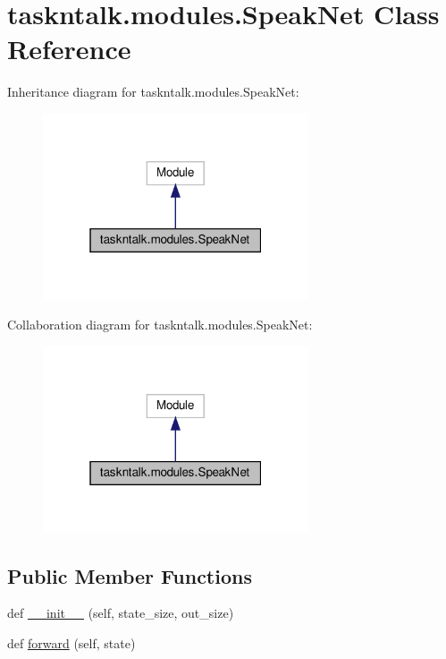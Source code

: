 \hypertarget{classtaskntalk_1_1modules_1_1SpeakNet}{}\section{taskntalk.\+modules.\+Speak\+Net Class Reference}
\label{classtaskntalk_1_1modules_1_1SpeakNet}


Inheritance diagram for taskntalk.\+modules.\+Speak\+Net\+:
\nopagebreak
\begin{figure}[H]
\begin{center}
\leavevmode
\includegraphics[width=223pt]{classtaskntalk_1_1modules_1_1SpeakNet__inherit__graph}
\end{center}
\end{figure}


Collaboration diagram for taskntalk.\+modules.\+Speak\+Net\+:
\nopagebreak
\begin{figure}[H]
\begin{center}
\leavevmode
\includegraphics[width=223pt]{classtaskntalk_1_1modules_1_1SpeakNet__coll__graph}
\end{center}
\end{figure}
\subsection*{Public Member Functions}
\begin{DoxyCompactItemize}
\item 
def \hyperlink{classtaskntalk_1_1modules_1_1SpeakNet_a480014fc4ece3fb538e2f5fc502dc463}{\+\_\+\+\_\+init\+\_\+\+\_\+} (self, state\+\_\+size, out\+\_\+size)
\item 
def \hyperlink{classtaskntalk_1_1modules_1_1SpeakNet_aebb6c91bc72ac69d30628f92c5e0232d}{forward} (self, state)
\end{DoxyCompactItemize}
